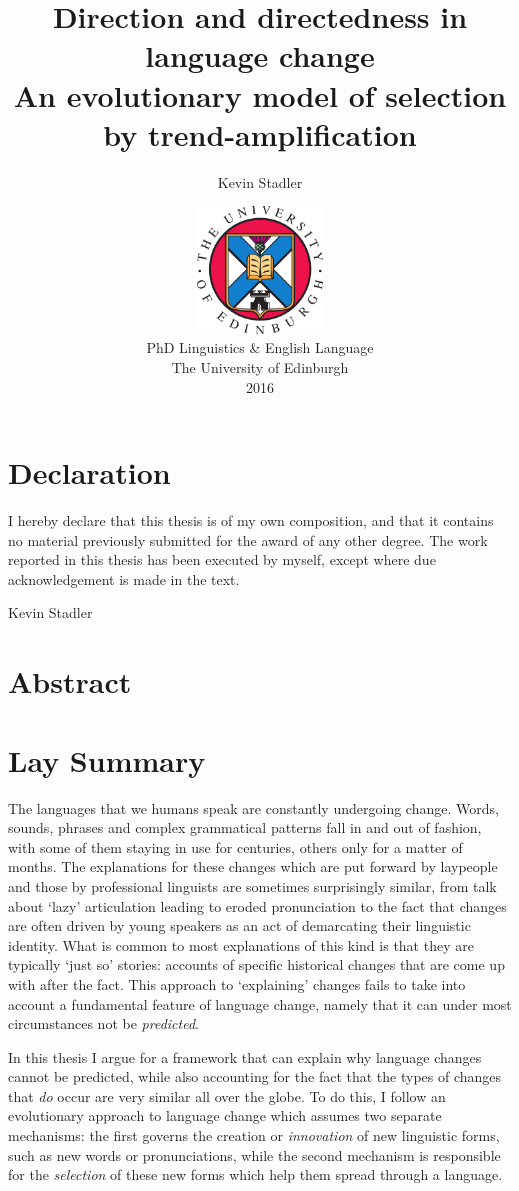 \documentclass[twoside,10pt]{book}
\author{Kevin Stadler}
\title{Direction and directedness in language change\\\large An evolutionary model of selection by trend-amplification}
\date{\vfill\includegraphics[width=0.25\textwidth]{edcrest}\\
\vspace{1em}
PhD Linguistics \& English Language\\
The University of Edinburgh\\
2016}
\begin{document}

\maketitle

\frontmatter

\chapter*{Declaration}
I hereby declare that this thesis is of my own composition, and that it contains no material previously submitted for the award of any other degree. The work reported in this thesis has been executed by myself, except where due
acknowledgement is made in the text.

\vspace{1in}\hfill Kevin Stadler

\chapter{Abstract}
\setcounter{page}{1}


\chapter{Lay Summary}
The languages that we humans speak are constantly undergoing change. Words, sounds, phrases and complex grammatical patterns fall in and out of fashion, with some of them staying in use for centuries, others only for a matter of months. The explanations for these changes which are put forward by laypeople and those by professional linguists are sometimes surprisingly similar, from talk about `lazy' articulation leading to eroded pronunciation to the fact that changes are often driven by young speakers as an act of demarcating their linguistic identity. What is common to most explanations of this kind is that they are typically `just so' stories: accounts of specific historical changes that are come up with after the fact. This approach to `explaining' changes fails to take into account a fundamental feature of language change, namely that it can under most circumstances not be \emph{predicted}.

In this thesis I argue for a framework that can explain why language changes cannot be predicted, while also accounting for the fact that the types of changes that \emph{do} occur are very similar all over the globe. To do this, I follow an evolutionary approach to language change which assumes two separate mechanisms: the first governs the creation or \emph{innovation} of new linguistic forms, such as new words or pronunciations, while the second mechanism is responsible for the \emph{selection} of these new forms which help them spread through a language.
\end{document}
